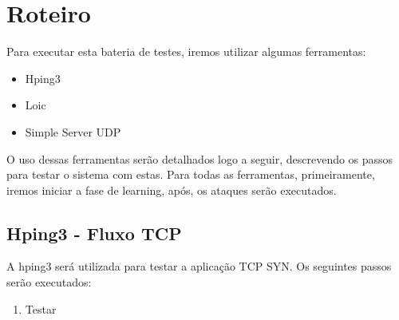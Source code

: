 \chapter[Roteiro]{Roteiro}

Para executar esta bateria de testes, iremos utilizar algumas ferramentas:

\begin{itemize}
    \item Hping3
    \item Loic
    \item Simple Server UDP
\end{itemize}

O uso dessas ferramentas serão detalhados logo a seguir, descrevendo os passos para
testar o sistema com estas. Para todas as ferramentas, primeiramente, iremos
iniciar a fase de learning, após, os ataques serão executados.

\section{Hping3 - Fluxo TCP}
\label{sec:Hping3 - Fluxo TCP}
A hping3 será utilizada para testar a aplicação TCP SYN. Os seguintes passos
serão executados:

\begin{enumerate}
    \item Testar
\end{enumerate}
